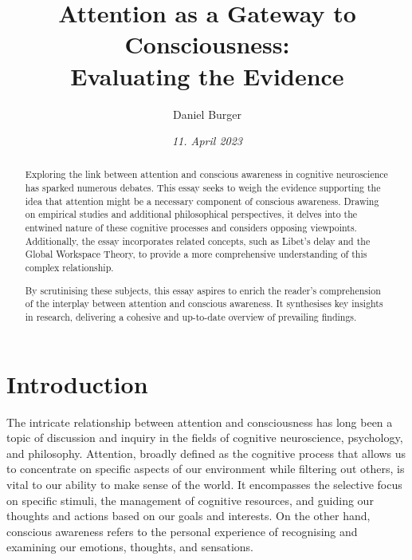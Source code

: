 \documentclass[10pt]{article}
\title{\textbf{Attention as a Gateway to Consciousness:} \\ Evaluating the Evidence}
\author[ ]{Daniel Burger}
\affil[ ]{\textbf{King’s College London}}
\affil[ ]{\href{mailto:public@danielburger.online}{public@danielburger.online}}
\date{\textit{11. April 2023}}
\begin{document}

\maketitle
\thispagestyle{empty}

\begin{sloppypar} %
  \begin{abstract}
    Exploring the link between attention and conscious awareness in cognitive neuroscience has sparked numerous debates. This essay seeks to weigh the evidence supporting the idea that attention might be a necessary component of conscious awareness. Drawing on empirical studies and additional philosophical perspectives, it delves into the entwined nature of these cognitive processes and considers opposing viewpoints. Additionally, the essay incorporates related concepts, such as Libet’s delay and the Global Workspace Theory, to provide a more comprehensive understanding of this complex relationship.

    By scrutinising these subjects, this essay aspires to enrich the reader’s comprehension of the interplay between attention and conscious awareness. It synthesises key insights in research, delivering a cohesive and up-to-date overview of prevailing findings.
  \end{abstract}
  \pagebreak

  \tableofcontents
  \pagebreak

  \listoffigures
  \pagebreak

  \listoftables
  \pagebreak


  \doublespacing


  \section{Introduction}
  \label{sec:introduction}

  The intricate relationship between attention and consciousness has long been a topic of discussion and inquiry in the fields of cognitive neuroscience, psychology, and philosophy. Attention, broadly defined as the cognitive process that allows us to concentrate on specific aspects of our environment while filtering out others, is vital to our ability to make sense of the world. It encompasses the selective focus on specific stimuli, the management of cognitive resources, and guiding our thoughts and actions based on our goals and interests. On the other hand, conscious awareness refers to the personal experience of recognising and examining our emotions, thoughts, and sensations.


\end{sloppypar}
\end{document}
